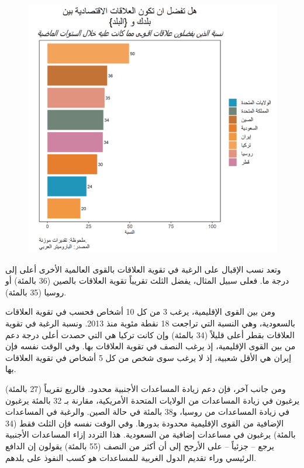 \documentclass{article}
\begin{document}
		\begin{center}
		\begin{figure}[H]
			\centering
			\includegraphics[width=13cm]{Q700.png}
		\end{figure}
	\end{center}
	
 وتعد نسب الإقبال على الرغبة في تقوية العلاقات بالقوى العالمية الأخرى أعلى إلى درجة ما. فعلى سبيل المثال، يفضل الثلث تقريباً تقوية العلاقات بالصين (36 بالمئة) أو روسيا (35 بالمئة). 
	
 ومن بين القوى الإقليمية، يرغب 3 من كل 10 أشخاص فحسب في تقوية العلاقات بالسعودية، وهي النسبة التي تراجعت 18 نقطة مئوية منذ 2013. ونسبة الرغبة في تقوية العلاقات بقطر أعلى قليلاً (34 بالمئة) وإن كانت تركيا هي التي حصدت أعلى درجة دعم من بين القوى الإقليمية، إذ يرغب النصف في تقوية العلاقات بها. وفي الوقت نفسه فإن إيران هي الأقل شعبية، إذ لا يرغب سوى شخص من كل 5 أشخاص في تقوية العلاقات بها.
	
 ومن جانب آخر، فإن دعم زيادة المساعدات الأجنبية محدود. فالربع تقريباً (27 بالمئة) يرغبون في زيادة المساعدات من الولايات المتحدة الأمريكية، مقارنة بـ 32 بالمئة يرغبون في زيادة المساعدات من روسيا، و38 بالمئة في حالة الصين. والرغبة في المساعدات الإضافية من القوى الإقليمية محدودة بدورها. وفي الوقت نفسه فإن الثلث فقط (34 بالمئة) يرغبون في مساعدات إضافية من السعودية. هذا التردد إزاء المساعدات الأجنبية يرجع – جزئياً – على الأرجح إلى أن أكثر من النصف (55 بالمئة) يقولون إن الدافع الرئيسي وراء تقديم الدول الغربية للمساعدات هو كسب النفوذ على بلدهم.
	
\end{document}

